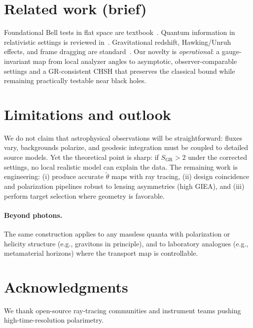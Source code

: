 \documentclass[11pt]{article}
\begin{document}
\section{Related work (brief)}
Foundational Bell tests in flat space are textbook~\cite{CHSH1969,FreedmanClauser1972,KocherCommins1967}. Quantum information in relativistic settings is reviewed in~\cite{PeresTerno2004}. Gravitational redshift, Hawking/Unruh effects, and frame dragging are standard~\cite{Hawking1975,Unruh1976,LenseThirring1918,WaldGR1994}. Our novelty is \emph{operational}: a gauge-invariant map from local analyzer angles to asymptotic, observer-comparable settings and a GR-consistent CHSH that preserves the classical bound while remaining practically testable near black holes.

\section{Limitations and outlook}
We do not claim that astrophysical observations will be straightforward: fluxes vary, backgrounds polarize, and geodesic integration must be coupled to detailed source models. Yet the theoretical point is sharp: if \(S_{\mathrm{GR}}>2\) under the corrected settings, no local realistic model can explain the data. The remaining work is engineering: (i) produce accurate \(\tilde{\theta}\) maps with ray tracing, (ii) design coincidence and polarization pipelines robust to lensing asymmetries (high GIEA), and (iii) perform target selection where geometry is favorable.

\paragraph{Beyond photons.} The same construction applies to any massless quanta with polarization or helicity structure (e.g., gravitons in principle), and to laboratory analogues (e.g., metamaterial horizons) where the transport map is controllable.

\section*{Acknowledgments}
We thank open-source ray-tracing communities and instrument teams pushing high-time-resolution polarimetry.

\small


\end{document}
